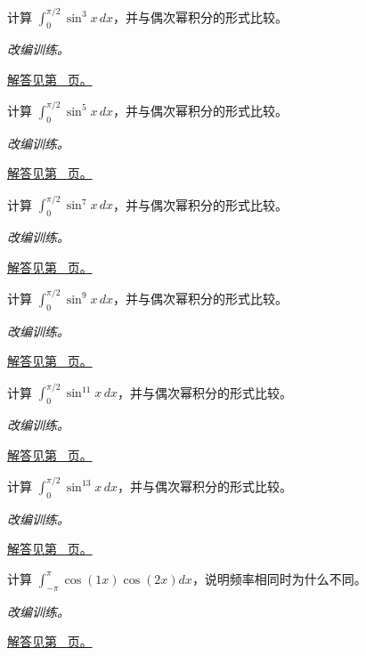 \documentclass[UTF8,12pt,a4paper,fontset=fandol]{ctexart}
\begin{document}
\begin{example}[正弦奇次幂的递推]\label{ex:c16q7}
计算 $\int_0^{\pi/2}\sin^{3}x\,dx$，并与偶次幂积分的形式比较。
\par\textit{改编训练。}\par\hyperref[ans:c16q7]{解答见第~\pageref{ans:c16q7} 页。}
\end{example}
\begin{example}[正弦奇次幂的递推]\label{ex:c16q8}
计算 $\int_0^{\pi/2}\sin^{5}x\,dx$，并与偶次幂积分的形式比较。
\par\textit{改编训练。}\par\hyperref[ans:c16q8]{解答见第~\pageref{ans:c16q8} 页。}
\end{example}
\begin{example}[正弦奇次幂的递推]\label{ex:c16q9}
计算 $\int_0^{\pi/2}\sin^{7}x\,dx$，并与偶次幂积分的形式比较。
\par\textit{改编训练。}\par\hyperref[ans:c16q9]{解答见第~\pageref{ans:c16q9} 页。}
\end{example}
\begin{example}[正弦奇次幂的递推]\label{ex:c16q10}
计算 $\int_0^{\pi/2}\sin^{9}x\,dx$，并与偶次幂积分的形式比较。
\par\textit{改编训练。}\par\hyperref[ans:c16q10]{解答见第~\pageref{ans:c16q10} 页。}
\end{example}
\begin{example}[正弦奇次幂的递推]\label{ex:c16q11}
计算 $\int_0^{\pi/2}\sin^{11}x\,dx$，并与偶次幂积分的形式比较。
\par\textit{改编训练。}\par\hyperref[ans:c16q11]{解答见第~\pageref{ans:c16q11} 页。}
\end{example}
\begin{example}[正弦奇次幂的递推]\label{ex:c16q12}
计算 $\int_0^{\pi/2}\sin^{13}x\,dx$，并与偶次幂积分的形式比较。
\par\textit{改编训练。}\par\hyperref[ans:c16q12]{解答见第~\pageref{ans:c16q12} 页。}
\end{example}
\begin{example}[余弦函数的正交积分]\label{ex:c16q13}
计算 $\int_{-\pi}^\pi\cos(1x)\cos(2x)dx$，说明频率相同时为什么不同。
\par\textit{改编训练。}\par\hyperref[ans:c16q13]{解答见第~\pageref{ans:c16q13} 页。}
\end{example}
\end{document}
